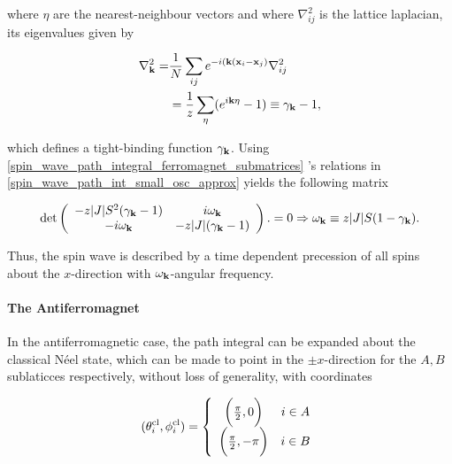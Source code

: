 \documentclass{homework}
\begin{document}
where $\eta$ are the nearest-neighbour vectors and where $\nabla_{ij}^2$ is the lattice laplacian, its eigenvalues given by 

\begin{equation}
\begin{split}
    \nabla^2_{{\bf k}} =& \frac{1}{N} \sum_{ij} e^{- i({\bf k}({\bf x}_i - {\bf x}_j)} \nabla_{ij}^2 \\
    &= \frac{1}{z} \sum_{\eta} (e^{i {\bf k} \eta} - 1) \equiv \gamma_{{\bf k}} - 1,
\end{split}
\end{equation}

which defines a tight-binding function $\gamma_{{\bf k}}$. Using \cref{spin_wave_path_integral_ferromagnet_submatrices} 's relations in \cref{spin_wave_path_int_small_osc_approx} yields the following matrix 

\begin{equation}
   \det \left(\begin{array}{cc}
         -z |J| S^2 (\gamma_{{\bf k}} - 1) & i \omega_{{\bf k}}  \\
         -i \omega_{{\bf k}} & -z |J| (\gamma_{{\bf k}} - 1)
    \end{array}\right). = 0 \Rightarrow \omega_{{\bf k}} \equiv z |J| S (1- \gamma_{{\bf k}}). 
    \label{spin_wave_path_integral_spin_wave_modes}
\end{equation}

Thus, the spin wave is described by a time dependent precession of all spins about the $x$-direction with $\omega_{{\bf k}}$-angular frequency. \\

\paragraph{The Antiferromagnet}

In the antiferromagnetic case, the path integral can be expanded about the classical Néel state, which can be made to point in the $\pm x$-direction for the $A,B$ sublaticces respectively, without loss of generality, with coordinates 

\begin{equation}
    (\theta_i^{\textnormal{cl}}, \phi_i^{\textnormal{cl}}) = \left\{ \begin{array}{cc}
        \bigg(\frac{\pi}{2}, 0\bigg) & i \in A \\
        \bigg(\frac{\pi}{2}, -\pi\bigg) & i \in B
    \end{array} \right.
\end{equation}
\end{document}
